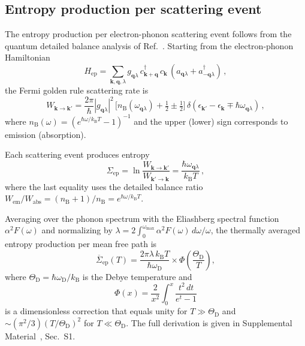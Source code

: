 \documentclass[prb,twocolumn,superscriptaddress,longbibliography,floatfix]{revtex4-2}
\newcommand{\kB}{k_{\mathrm{B}}}
\newcommand{\oD}{\omega_{\mathrm{D}}}
\newcommand{\ThetaD}{\Theta_{\mathrm{D}}}
\begin{document}
\subsection{Entropy production per scattering event}

The entropy production per electron-phonon scattering event
follows from the quantum detailed balance analysis of
Ref.~\cite{Huang2026}.  Starting from the electron-phonon
Hamiltonian
\begin{equation}\label{eq:H_ep}
  H_{\mathrm{ep}} = \sum_{\bm{k},\bm{q},\lambda}
  g_{\bm{q}\lambda}\, c_{\bm{k}+\bm{q}}^\dagger\, c_{\bm{k}}\,
  (a_{\bm{q}\lambda} + a_{-\bm{q}\lambda}^\dagger)\,,
\end{equation}
the Fermi golden rule scattering rate is
\begin{equation}\label{eq:golden_rule}
  W_{\bm{k}\to\bm{k}'} = \frac{2\pi}{\hbar}
  |g_{\bm{q}\lambda}|^2\,
  \bigl[n_{\mathrm{B}}(\omega_{\bm{q}\lambda}) + \tfrac{1}{2}
  \pm \tfrac{1}{2}\bigr]\,
  \delta(\epsilon_{\bm{k}'} - \epsilon_{\bm{k}} \mp \hbar\omega_{\bm{q}\lambda})\,,
\end{equation}
where $n_{\mathrm{B}}(\omega) = (e^{\hbar\omega/\kB T} - 1)^{-1}$
and the upper (lower) sign corresponds to emission (absorption).

Each scattering event produces entropy
\begin{equation}\label{eq:Sigma_event}
  \Sigma_{\mathrm{ep}} = \ln\frac{W_{\bm{k}\to\bm{k}'}}{W_{\bm{k}'\to\bm{k}}}
  = \frac{\hbar\omega_{\bm{q}\lambda}}{\kB T}\,,
\end{equation}
where the last equality uses the detailed balance ratio
$W_{\mathrm{em}}/W_{\mathrm{abs}} = (n_{\mathrm{B}}+1)/n_{\mathrm{B}}
= e^{\hbar\omega/\kB T}$.

Averaging over the phonon spectrum with the Eliashberg spectral
function $\alpha^2 F(\omega)$ and normalizing by
$\lambda = 2\int_0^{\omega_{\max}} \alpha^2 F(\omega)\, d\omega/\omega$,
the thermally averaged entropy production per mean free path is
\begin{equation}\label{eq:Sigma_avg}
  \overline{\Sigma}_{\mathrm{ep}}(T)
  = \frac{2\pi\lambda\, \kB T}{\hbar\oD}
  \times \Phi\!\left(\frac{\ThetaD}{T}\right),
\end{equation}
where $\ThetaD = \hbar\oD / \kB$ is the Debye temperature and
\begin{equation}\label{eq:Phi}
  \Phi(x) = \frac{2}{x^2} \int_0^x \frac{t^2\,dt}{e^t - 1}
\end{equation}
is a dimensionless correction that equals unity for $T \gg \ThetaD$
and $\sim (\pi^2/3)(T/\ThetaD)^2$ for $T \ll \ThetaD$.  The full
derivation is given in Supplemental Material~\cite{supplement},
Sec.~S1.
\end{document}
